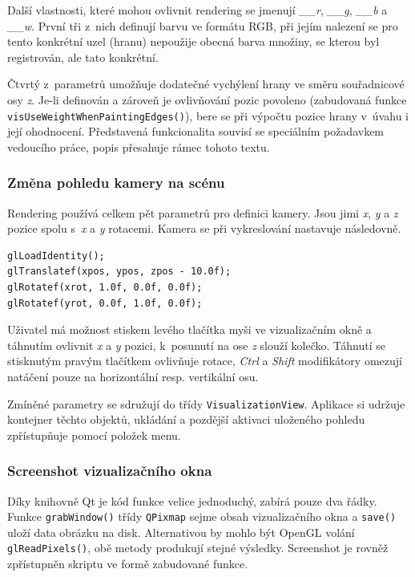 \documentclass[11pt,twoside,a4paper]{book}
\begin{document}
Další vlastnosti, které mohou ovlivnit rendering se jmenují \textit{\_\_r}, \textit{\_\_g}, \textit{\_\_b} a \textit{\_\_w}. První tři z~nich definují barvu ve formátu RGB, při jejím nalezení se pro tento konkrétní uzel (hranu) nepoužije obecná barva množiny, se kterou byl registrován, ale tato konkrétní.

Čtvrtý z~parametrů umožňuje dodatečné vychýlení hrany ve směru souřadnicové osy \textit{z}. Je-li definován a zároveň je ovlivňování pozic povoleno (zabudovaná funkce \texttt{vis\-Use\-Weight\-When\-Pa\-in\-ting\-Ed\-ges()}), bere se při výpočtu pozice hrany v~úvahu i její ohodnocení. Představená funkcionalita souvisí se speciálním požadavkem vedoucího práce, popis přesahuje rámec tohoto textu.


\subsubsection{Změna pohledu kamery na scénu}

Rendering používá celkem pět parametrů pro definici kamery. Jsou jimi \textit{x}, \textit{y} a \textit{z} pozice spolu s~\textit{x} a \textit{y} rotacemi. Kamera se při vykreslování nastavuje následovně.

\begin{verbatim}
glLoadIdentity();
glTranslatef(xpos, ypos, zpos - 10.0f);
glRotatef(xrot, 1.0f, 0.0f, 0.0f);
glRotatef(yrot, 0.0f, 1.0f, 0.0f);
\end{verbatim}

Uživatel má možnost stiskem levého tlačítka myši ve vizualizačním okně a táhnutím ovlivnit \textit{x} a \textit{y} pozici, k~posunutí na ose \textit{z} slouží kolečko. Táhnutí se stisknutým pravým tlačítkem ovlivňuje rotace, \textit{Ctrl} a \textit{Shift} modifikátory omezují natáčení pouze na horizontální resp. vertikální osu.

Zmíněné parametry se sdružují do třídy \texttt{VisualizationView}. Aplikace si udržuje kontejner těchto objektů, ukládání a pozdější aktivaci uloženého pohledu zpřístupňuje pomocí položek menu.


\subsubsection{Screenshot vizualizačního okna}

Díky knihovně Qt je kód funkce velice jednoduchý, zabírá pouze dva řádky. Funkce \texttt{grab\-Win\-dow()} třídy \texttt{QPixmap} sejme obsah vizualizačního okna a \texttt{save()} uloží data obrázku na disk. Alternativou by mohlo být OpenGL volání \texttt{glReadPixels()}, obě metody produkují stejné výsledky. Screenshot je rovněž zpřístupněn skriptu ve formě zabudované funkce.
\end{document}
